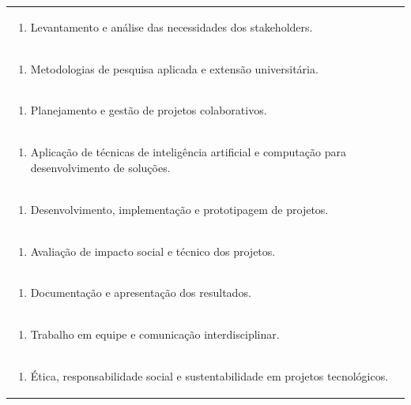 \documentclass[11pt]{article}
\begin{document}
\begin{center}
\begin{longtable}{|p{4cm}|p{4cm}|p{4cm}|p{4cm}|}
\multicolumn{4}{|p{\dimexpr 16cm + 6\tabcolsep\relax}|}{\begin{enumerate}[start=2]\item Levantamento e análise das necessidades dos stakeholders.\end{enumerate}}\\
\multicolumn{4}{|p{\dimexpr 16cm + 6\tabcolsep\relax}|}{\begin{enumerate}[start=3]\item Metodologias de pesquisa aplicada e extensão universitária.\end{enumerate}}\\
\multicolumn{4}{|p{\dimexpr 16cm + 6\tabcolsep\relax}|}{\begin{enumerate}[start=4]\item Planejamento e gestão de projetos colaborativos.\end{enumerate}}\\
\multicolumn{4}{|p{\dimexpr 16cm + 6\tabcolsep\relax}|}{\begin{enumerate}[start=5]\item Aplicação de técnicas de inteligência artificial e computação para desenvolvimento de soluções.\end{enumerate}}\\
\multicolumn{4}{|p{\dimexpr 16cm + 6\tabcolsep\relax}|}{\begin{enumerate}[start=6]\item Desenvolvimento, implementação e prototipagem de projetos.\end{enumerate}}\\
\multicolumn{4}{|p{\dimexpr 16cm + 6\tabcolsep\relax}|}{\begin{enumerate}[start=7]\item Avaliação de impacto social e técnico dos projetos.\end{enumerate}}\\
\multicolumn{4}{|p{\dimexpr 16cm + 6\tabcolsep\relax}|}{\begin{enumerate}[start=8]\item Documentação e apresentação dos resultados.\end{enumerate}}\\
\multicolumn{4}{|p{\dimexpr 16cm + 6\tabcolsep\relax}|}{\begin{enumerate}[start=9]\item Trabalho em equipe e comunicação interdisciplinar.\end{enumerate}}\\
\multicolumn{4}{|p{\dimexpr 16cm + 6\tabcolsep\relax}|}{\begin{enumerate}[start=10]\item Ética, responsabilidade social e sustentabilidade em projetos tecnológicos.\end{enumerate}}\\

\end{longtable}
\end{center}
\end{document}
